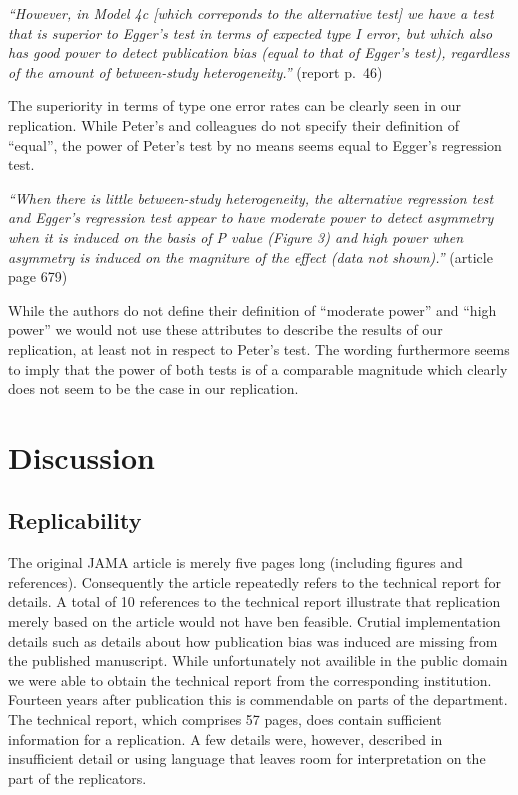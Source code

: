 \documentclass[
  english,
  doc,floatsintext,draftall]{apa6}
\begin{document}
\emph{\enquote{However, in Model 4c {[}which correponds to the alternative test{]} we have a test that is superior to Egger's test in terms of expected type I error, but which also has good power to detect publication bias (equal to that of Egger's test), regardless of the amount of between-study heterogeneity.}} (report p.~46)

The superiority in terms of type one error rates can be clearly seen in our replication.
While Peter's and colleagues do not specify their definition of \enquote{equal},
the power of Peter's test by no means seems equal to Egger's regression test.

\emph{\enquote{When there is little between-study heterogeneity, the alternative regression test and Egger's regression test appear to have moderate power to detect asymmetry when it is induced on the basis of P value (Figure 3) and high power when asymmetry is induced on the magniture of the effect (data not shown).}} (article page 679)

While the authors do not define their definition of \enquote{moderate power} and \enquote{high power} we would not use these attributes to describe the results of our replication,
at least not in respect to Peter's test.
The wording furthermore seems to imply that the power of both tests is of a comparable magnitude which clearly does not seem to be the case in our replication.

\hypertarget{discussion}{%
\section{Discussion}\label{discussion}}

\hypertarget{replicability}{%
\subsection{Replicability}\label{replicability}}

The original JAMA article is merely five pages long (including figures and references).
Consequently the article repeatedly refers to the technical report for details.
A total of 10 references to the technical report illustrate that replication merely based on the article would not have ben feasible.
Crutial implementation details such as details about how publication bias was induced are missing from the published manuscript.
While unfortunately not availible in the public domain we were able to obtain the technical report from the corresponding institution.
Fourteen years after publication this is commendable on parts of the department.
The technical report, which comprises 57 pages, does contain sufficient information for a replication.
A few details were, however, described in insufficient detail or using language that leaves room for interpretation on the part of the replicators.
\end{document}
